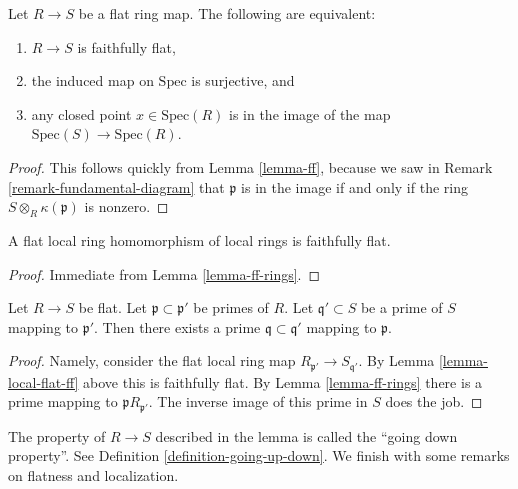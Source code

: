 \begin{lemma}
\label{lemma-ff-rings}
Let $R \to S$ be a flat ring map.
The following are equivalent:
\begin{enumerate}
\item $R \to S$ is faithfully flat,
\item the induced map on $\text{Spec}$ is surjective, and
\item any closed point $x \in \text{Spec}(R)$ is
in the image of the map $\text{Spec}(S) \to \text{Spec}(R)$.
\end{enumerate}
\end{lemma}

\begin{proof}
This follows quickly from Lemma \ref{lemma-ff}, because we
saw in Remark \ref{remark-fundamental-diagram}
that $\mathfrak p$ is in the image
if and only if the ring $S \otimes_R \kappa(\mathfrak p)$
is nonzero.
\end{proof}

\begin{lemma}
\label{lemma-local-flat-ff}
A flat local ring homomorphism of local rings is faithfully flat.
\end{lemma}

\begin{proof}
Immediate from Lemma \ref{lemma-ff-rings}.
\end{proof}

\begin{lemma}
\label{lemma-flat-going-down}
Let $R\to S$ be flat. Let $\mathfrak p \subset \mathfrak p'$
be primes of $R$. Let $\mathfrak q' \subset S$ be a prime of $S$
mapping to $\mathfrak p'$. Then there exists a prime
$\mathfrak q \subset \mathfrak q'$ mapping to $\mathfrak p$.
\end{lemma}

\begin{proof}
Namely, consider the flat local ring map
$R_{\mathfrak p'} \to S_{\mathfrak q'}$.
By Lemma \ref{lemma-local-flat-ff} above this is faithfully
flat. By Lemma \ref{lemma-ff-rings} there is a prime mapping to
$\mathfrak p R_{\mathfrak p'}$. The inverse image of this
prime in $S$ does the job.
\end{proof}

\noindent
The property of $R \to S$ described in the lemma is called the
``going down property''. See Definition \ref{definition-going-up-down}.
We finish with some remarks on flatness and localization.

